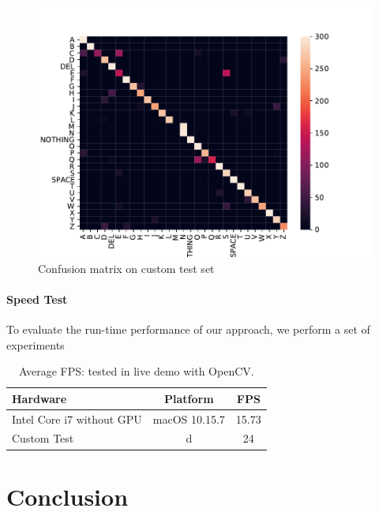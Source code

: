 \documentclass[10pt,twocolumn,letterpaper]{article}
\begin{document}
\begin{figure}[h]
\begin{center}
\includegraphics[width=1\linewidth]{imgs/confusion}
\end{center}
   \caption{Confusion matrix on custom test set}
\label{fig:confusion}
\end{figure}

\paragraph{Speed Test}
To evaluate the run-time performance of our approach, we perform a set of experiments   

\begin{table}[h]
\begin{center}
\begin{tabular}{|l|c|c|}
\hline
Hardware & Platform &FPS \\
\hline\hline
Intel Core i7 without GPU & macOS 10.15.7 & 15.73\\
Custom Test & d & 24\\
\hline
\end{tabular}
\end{center}
\caption{Average FPS: tested in live demo with OpenCV.}
\label{table:fps}
\end{table}


\section{Conclusion}
\blindtext



{\small


}
\end{document}
